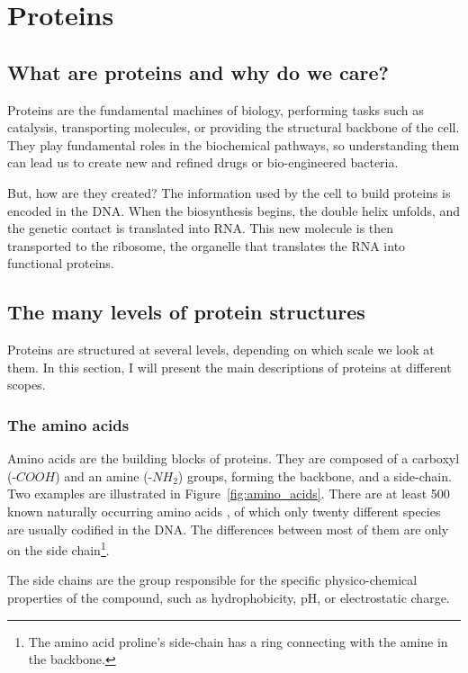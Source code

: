 \chapter{Proteins}
\section[What are proteins?]{What are proteins and why do we care?}
Proteins are the fundamental machines of biology, performing tasks such as catalysis, transporting molecules, or providing the structural backbone of the cell.
They play fundamental roles in the biochemical pathways, so understanding them can lead us to create new and refined drugs
or bio-engineered bacteria.


But, how are they created?
The information 
used by the cell to build proteins is encoded in the DNA.
When the biosynthesis begins, the double helix unfolds, and the genetic contact is translated into RNA.
This new molecule is then transported to the ribosome, the organelle that translates the RNA into functional proteins.


\section{The many levels of protein structures}
Proteins are structured at several levels, depending on which scale we look at them.
In this section, I will present the main descriptions of proteins at different scopes.


\subsection{The amino acids}
Amino acids are the building blocks of proteins.
They are composed of a carboxyl (-$COOH$) and an amine (-$NH_2$) groups, forming the backbone, and a side-chain.
Two examples are illustrated in Figure~\ref{fig:amino_acids}.
There are at least 500 known naturally occurring amino acids \citep{500_amino_acids}, of which only twenty different species are usually codified in the DNA.
The differences between most of them are only on the side chain\footnote{The amino acid proline's side-chain has a ring connecting with the amine in the backbone.}.

The side chains are the group responsible for the specific physico-chemical properties of the compound, such as hydrophobicity, pH, or electrostatic charge.

